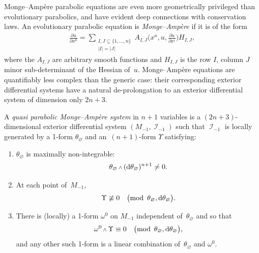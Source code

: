 \documentclass[pdftex]{sigma}
\DeclareMathOperator{\I}{\mathcal{I}}
\renewcommand{\d}{{\rm d}}
\renewcommand{\mod}[1]{\quad\big(\mathrm{mod\enspace} #1\big)}
\newcommand{\pDeriv}[2]{\frac{\partial #1}{\partial #2}}
\newcommand{\w}{{\mathchoice{\,{\scriptstyle\wedge}\,}{{\scriptstyle\wedge}}
 {{\scriptscriptstyle\wedge}}{{\scriptscriptstyle\wedge}}}}
\newcommand{\thetas}[1]{\theta_{#1}}
\numberwithin{equation}{section}
\begin{document}
Monge--Amp\`ere parabolic equations are even more geometrically privileged than evolutionary parabolics, and have evident deep connections with conservation laws. An evolutionary parabolic equation is \emph{Monge--Amp\`ere} if it is of the form
\begin{gather*}%
 \pDeriv{u}{x^0} = \sum_{\substack{I, J \subseteq \{1,\dots,n\} \\ |I|=|J|}} A_{I,J}\bigg(x^a,u,\pDeriv{u}{x^i}\bigg) H_{I,J} ,
\end{gather*}
where the $A_{I,J}$ are arbitrary smooth functions and $H_{I,J}$ is the row $I$, column $J$ minor sub-determinant of the Hessian of~$u$. Monge--Amp\`ere equations are quantifiably less complex than the generic case: their corresponding exterior differential systems have a natural de-prolongation to an exterior differential system of dimension only $2n+3$.
\begin{Definition}%
 A \emph{quasi parabolic Monge--Amp\`ere system} in $n+1$ variables is a $(2n+3)$-di\-men\-sio\-nal exterior differential system $(M_{-1},\I_{-1})$ such that $\I_{-1}$ is locally generated by a 1-form $\thetas{\varnothing}$ and an~$(n+1)$-form $\Upsilon$ satisfying:
 \begin{enumerate}\itemsep=0pt
 \item $\thetas{\varnothing}$ is maximally non-integrable:
 \begin{gather*}
 \thetas{\varnothing} \w (\d\thetas{\varnothing})^{n+1} \neq 0 .
 \end{gather*}
 \item At each point of~$M_{-1}$,
 \begin{gather*}
 \Upsilon \not\equiv 0 \mod{\thetas{\varnothing}, \d\thetas{\varnothing}} .
 \end{gather*}
 \item There is (locally) a 1-form $\omega^0$ on $M_{-1}$ independent of~$\thetas{\varnothing}$ and so that
 \begin{gather*}
 \omega^0\w\Upsilon \equiv 0 \mod{\thetas{\varnothing}, \d\thetas{\varnothing}} ,
 \end{gather*}
 and any other such 1-form is a linear combination of~$\thetas{\varnothing}$ and $\omega^0$.
 \end{enumerate}
\end{Definition}
\end{document}
